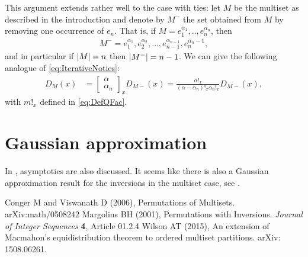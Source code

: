 \documentclass{article}
\DeclarePairedDelimiter\abs{\lvert}{\rvert}
\begin{document}
This argument extends rather well to the case with ties: let $M$ be the multiset as described in the introduction and denote by $M^-$ the set obtained from $M$ by removing one occurrence of $e_n$. That is, if $M=e_1^{\alpha_1},..,e_n^{\alpha_n}$, then
\begin{align}
    M^- = e_1^{\alpha_1}, e_2^{\alpha_2},\ldots,e_{n-1}^{\alpha_{n-1}}, e_n^{\alpha_n-1},
\end{align}
and in particular if $\abs{M}=n$ then $\abs{M^-}=n-1$. We can give the following analogue of \eqref{eq:IterativeNoties}:
\begin{align}
    D_M(x) & = \begin{bmatrix}\alpha\\ \alpha_n\end{bmatrix}_x D_{M-}(x) = \frac{\alpha!_x}{(\alpha-\alpha_n)!_x \alpha_n!_x} D_{M-}(x),
\end{align}
with $m!_x$ defined in \eqref{eq:DefQFac}.



\section{Gaussian approximation}

In \cite{Margolius}, asymptotics are also discussed. It seems like there is also a Gaussian approximation result for the inversions in the multiset case, see \cite{CongerViswanath}. 





\begin{thebibliography}{99}
Conger M and Viswanath D (2006), Permutations of Multisets. arXiv:math/0508242
  Margolius BH (2001), Permutations with Inversions. \emph{Journal of Integer Sequences} \textbf{4}, Article 01.2.4 
  Wilson AT (2015), An extension of Macmahon's equidistribution theorem to ordered multiset partitions. arXiv: 1508.06261.
\end{thebibliography}
\end{document}

